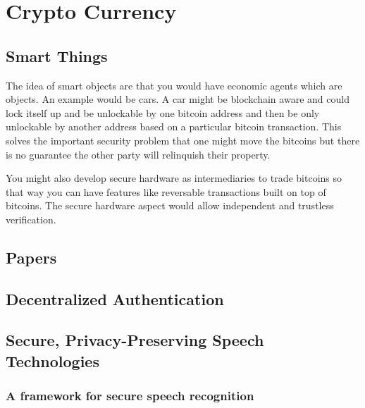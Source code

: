 \chapter{Crypto Currency}
\section{Smart Things}
The idea of smart objects are that you would have economic agents which
are objects. An example would be cars. A car might be blockchain aware
and could lock itself up and be unlockable by one bitcoin address
and then be only unlockable by another address based on a particular
bitcoin transaction. This solves the important security problem that one might
move the bitcoins but there is no guarantee the other party will relinquish
their property.

You might also develop secure hardware as intermediaries to trade bitcoins
so that way you can have features like reversable transactions built on
top of bitcoins.  The secure hardware aspect would allow independent and 
trustless verification.

\section{Papers}

\section{Decentralized Authentication}

\section{Secure, Privacy-Preserving Speech Technologies}


\subsection{A framework for secure speech recognition}

